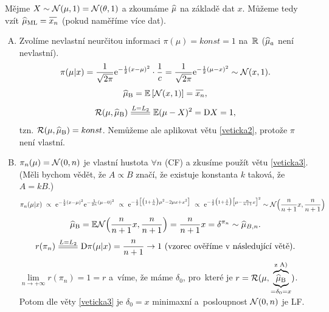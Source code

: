 \begin{example}
	Mějme $X\sim\mathcal{N}(\mu,1)=\mathcal{N}(\theta,1)$ a zkoumáme $\widehat{\mu}$ na základě dat $x$. Můžeme tedy vzít $\widehat{\mu}_{\mathrm{ML}}=\oxnn$ (pokud naměříme více dat).
	\begin{enumerate}[A)]
		\item Zvolíme nevlastní neurčitou informaci $\pi(\mu)=konst=1$ na~$\mathbb{R}$ ($\widehat{\mu}_a$ není nevlastní). $$\pi(\mu|x)=\frac{1}{\sqrt{2\pi}}\mathrm{e}^{-\frac{1}{2}(x-\mu)^2}\cdot \frac{1}{c}=\frac{1}{\sqrt{2\pi}}\mathrm{e}^{-\frac{1}{2}(\mu-x)^2}\sim\mathcal{N}(x,1).$$
		$$\widehat{\mu}_\mathrm{B}=\EE{\NN(x,1)}=\oxnn,$$
		$$ \RF(\mu,\widehat{\mu}_\mathrm{B})\equal{L=L_2}\E(\mu-X)^2=\D X=1,$$ tzn. $\mathcal{R}(\mu,\widehat{\mu}_\mathrm{B})=konst$. Nemůžeme ale aplikovat větu \ref{veticka2}, protože $\pi$ není vlastní.
		\item $\pi_n(\mu)=\mathcal{N}(0,n)$ je vlastní hustota $\forall n$ (CF) a zkusíme použít větu \ref{veticka3}. (Měli bychom vědět, že $A \propto B$ značí, že existuje konstanta $k$ taková, že $A=kB$.)
		\[
		\begin{split}
		\pi_n(\mu|x)~\propto~ \mathrm{e}^{-\frac{1}{2}(x-\mu)^2}\mathrm{e}^{-\frac{1}{2n}(\mu-0)^2}~\propto~\mathrm{e}^{-\frac{1}{2}\big[\big(1+\frac{1}{n}\big)\mu^2-2\mu x+x^2\big]}~\propto~\mathrm{e}^{-\frac{1}{2}\big(1+\frac{1}{n}\big)\big[\mu-\frac{n}{n+1}x\big]^2}\sim \mathcal{N}\Big(\frac{n}{n+1}x,\frac{n}{n+1}\Big)
		\end{split}
		\]
		$$\widehat{\mu}_\mathrm{B}=\mathbb{E} \mathcal{N}\Big(\frac{n}{n+1}x,\frac{n}{n+1}\Big)=\frac{n}{n+1}x=\delta^{\pi_n}\sim\widehat{\mu}_{B,n}.$$
		$$r(\pi_n)\equal{L=L_2}\D \pi(\mu|x)=\frac{n}{n+1}\to1 \text{ (vzorec ověříme v~následující větě)}.$$
		$\lim\limits_{n\to+\infty}r(\pi_n)=1=r$ a~víme, že máme $\delta_0$, pro~které je $r=\mathcal{R}(\mu,\underbrace{\overbrace{\widehat{\mu}_\mathrm{B}}^{\text{z A)}}}_{=\delta_0=x})$. Potom dle věty \ref{veticka3} je $\delta_0=x$ minimaxní a~posloupnost $\mathcal{N}(0,n)$ je LF.
	\end{enumerate}
\end{example}
